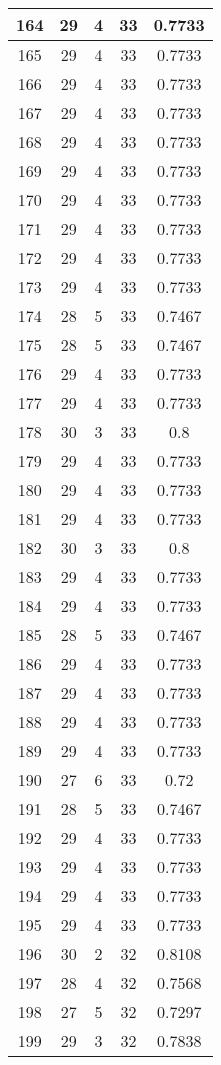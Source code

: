 \documentclass[letterpaper, 12pt]{article}
\begin{document}
\begin{longtable}{|c|c|c|c|c|}
\hline
164 & 29 & 4 & 33 & 0.7733 \\
\hline
165 & 29 & 4 & 33 & 0.7733 \\
\hline
166 & 29 & 4 & 33 & 0.7733 \\
\hline
167 & 29 & 4 & 33 & 0.7733 \\
\hline
168 & 29 & 4 & 33 & 0.7733 \\
\hline
169 & 29 & 4 & 33 & 0.7733 \\
\hline
170 & 29 & 4 & 33 & 0.7733 \\
\hline
171 & 29 & 4 & 33 & 0.7733 \\
\hline
172 & 29 & 4 & 33 & 0.7733 \\
\hline
173 & 29 & 4 & 33 & 0.7733 \\
\hline
174 & 28 & 5 & 33 & 0.7467 \\
\hline
175 & 28 & 5 & 33 & 0.7467 \\
\hline
176 & 29 & 4 & 33 & 0.7733 \\
\hline
177 & 29 & 4 & 33 & 0.7733 \\
\hline
178 & 30 & 3 & 33 & 0.8 \\
\hline
179 & 29 & 4 & 33 & 0.7733 \\
\hline
180 & 29 & 4 & 33 & 0.7733 \\
\hline
181 & 29 & 4 & 33 & 0.7733 \\
\hline
182 & 30 & 3 & 33 & 0.8 \\
\hline
183 & 29 & 4 & 33 & 0.7733 \\
\hline
184 & 29 & 4 & 33 & 0.7733 \\
\hline
185 & 28 & 5 & 33 & 0.7467 \\
\hline
186 & 29 & 4 & 33 & 0.7733 \\
\hline
187 & 29 & 4 & 33 & 0.7733 \\
\hline
188 & 29 & 4 & 33 & 0.7733 \\
\hline
189 & 29 & 4 & 33 & 0.7733 \\
\hline
190 & 27 & 6 & 33 & 0.72 \\
\hline
191 & 28 & 5 & 33 & 0.7467 \\
\hline
192 & 29 & 4 & 33 & 0.7733 \\
\hline
193 & 29 & 4 & 33 & 0.7733 \\
\hline
194 & 29 & 4 & 33 & 0.7733 \\
\hline
195 & 29 & 4 & 33 & 0.7733 \\
\hline
196 & 30 & 2 & 32 & 0.8108 \\
\hline
197 & 28 & 4 & 32 & 0.7568 \\
\hline
198 & 27 & 5 & 32 & 0.7297 \\
\hline
199 & 29 & 3 & 32 & 0.7838 \\
\hline
\end{longtable}
\end{document}
